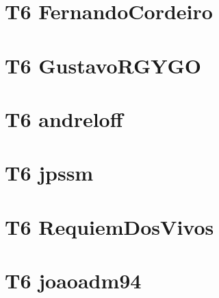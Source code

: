 \chapter{T6 FernandoCordeiro}


\chapter{T6 GustavoRGYGO}


\chapter{T6 andreloff}


\chapter{T6 jpssm}


\chapter{T6 RequiemDosVivos}


\chapter{T6 joaoadm94}

